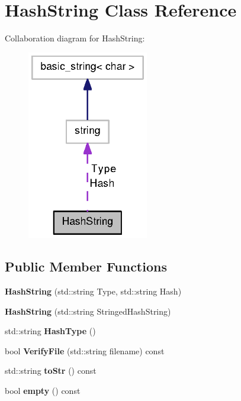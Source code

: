 \section{\-Hash\-String \-Class \-Reference}
\label{classHashString}


\-Collaboration diagram for \-Hash\-String\-:
\nopagebreak
\begin{figure}[H]
\begin{center}
\leavevmode
\includegraphics[width=150pt]{classHashString__coll__graph}
\end{center}
\end{figure}
\subsection*{\-Public \-Member \-Functions}
\begin{DoxyCompactItemize}
\item 
{\bfseries \-Hash\-String} (std\-::string \-Type, std\-::string \-Hash)\label{classHashString_ac3ff0864fc6c1ce8e63352fc850b25f9}

\item 
{\bfseries \-Hash\-String} (std\-::string \-Stringed\-Hash\-String)\label{classHashString_a90ecf4a2f5ed43110f38f30e86a0fce2}

\item 
std\-::string {\bfseries \-Hash\-Type} ()\label{classHashString_a5bbe061d75d77076b8fcd94b14d92af3}

\item 
bool {\bfseries \-Verify\-File} (std\-::string filename) const \label{classHashString_a8230213584e0569dc72a9c3f7bb053cb}

\item 
std\-::string {\bfseries to\-Str} () const \label{classHashString_a32fb53f25449610fe7f993dcda987ad4}

\item 
bool {\bfseries empty} () const \label{classHashString_ac6e61de369e994009e36f344f99c15ad}

\end{DoxyCompactItemize}
